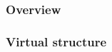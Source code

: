 \documentclass[student]{ITRslides}
\begin{document}
\begin{frame}
	\frametitle{Overview}

			\begin{figure}
			\centering
			\def\svgwidth{0.99\columnwidth}
			
			\end{figure}

\end{frame}
\begin{frame}
	\frametitle{Virtual structure}

			\begin{figure}
			\centering
			\def\svgwidth{0.99\columnwidth}
			
			\end{figure}

\end{frame}

%
%
\end{document}
